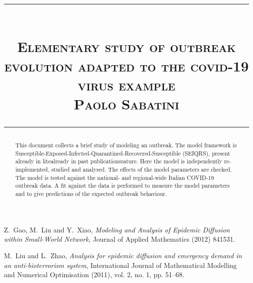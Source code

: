 \documentclass{article}
\title{
\begin{flushleft}
\rule{\textwidth}{1pt}\\
  \textsc{\textbf{Elementary study of outbreak evolution adapted to the covid-19 virus example 	}}\\[2mm]
\textsc{\large Paolo Sabatini}\\
\rule{\textwidth}{1pt}
  \end{flushleft}
}
\date{}
\begin{document}
\maketitle


\begin{abstract}
This document collects a brief study of modeling an outbreak. The model framework is Susceptible-Exposed-Infected-Quarantined-Recovered-Susceptible (SEIQRS), present already in litealready in past publicationsrature. Here the model is independently re-implemented, studied and analysed. The effects of the model parameters are checked. The model is tested against the national- and regional-wide Italian COVID-19 outbreak data. A fit against the data is performed to measure the model parameters and to give predictions of the expected outbreak behaviour.
\end{abstract}
\vspace{2cm}
\tableofcontents

\newpage





\begin{thebibliography}{9}
Z.~Gao, M.~Liu and Y.~Xiao, 
\textit{Modeling and Analysis of Epidemic Diffusion within Small-World Network},
Journal of Applied Mathematics (2012) 841531.

M.~Liu and L.~Zhao, 
\textit{Analysis for epidemic diffusion and emergency demand in an anti-bioterrorism
system},
International Journal of Mathematical Modelling and Numerical Optimisation (2011), vol. 2, no. 1, pp. 51–68.
\end{thebibliography}
\end{document}
